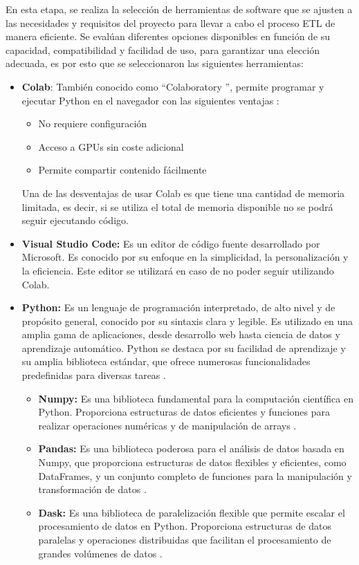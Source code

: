 En esta etapa, se realiza la selección de herramientas de software que se ajusten a las necesidades y requisitos del proyecto para llevar a cabo el proceso ETL de manera eficiente. Se evalúan diferentes opciones disponibles en función de su capacidad, compatibilidad y facilidad de uso, para garantizar una elección adecuada, es por esto que se seleccionaron las siguientes herramientas:
\begin{itemize}
    \item \textbf{Colab}: También conocido como \textquotedblleft Colaboratory \textquotedblright, permite programar y ejecutar Python en el navegador con las siguientes ventajas \cite{colab}:
    \begin{itemize}
        \item No requiere configuración
        \item Acceso a GPUs sin coste adicional
        \item Permite compartir contenido fácilmente
    \end{itemize}
    Una de las desventajas de usar Colab es que tiene una cantidad de memoria limitada, es decir, si se utiliza el total de memoria disponible no se podrá seguir ejecutando código.
    \item \textbf{Visual Studio Code:} Es un editor de código fuente desarrollado por Microsoft. Es conocido por su enfoque en la simplicidad, la personalización y la eficiencia. Este editor se utilizará en caso de no poder seguir utilizando Colab.
    \item \textbf{Python:} Es un lenguaje de programación interpretado, de alto nivel y de propósito general, conocido por su sintaxis clara y legible. Es utilizado en una amplia gama de aplicaciones, desde desarrollo web hasta ciencia de datos y aprendizaje automático. Python se destaca por su facilidad de aprendizaje y su amplia biblioteca estándar, que ofrece numerosas funcionalidades predefinidas para diversas tareas \cite{python}.
    \begin{itemize}
        \item \textbf{Numpy:} Es una biblioteca fundamental para la computación científica en Python. Proporciona estructuras de datos eficientes y funciones para realizar operaciones numéricas y de manipulación de arrays \cite{numpy}.
        \item \textbf{Pandas:} Es una biblioteca poderosa para el análisis de datos basada en Numpy, que proporciona estructuras de datos flexibles y eficientes, como DataFrames, y un conjunto completo de funciones para la manipulación y transformación de datos \cite{pandas}.
        \item \textbf{Dask:} Es una biblioteca de paralelización flexible que permite escalar el procesamiento de datos en Python. Proporciona estructuras de datos paralelas y operaciones distribuidas que facilitan el procesamiento de grandes volúmenes de datos \cite{dask}.
    \end{itemize}
\end{itemize}

